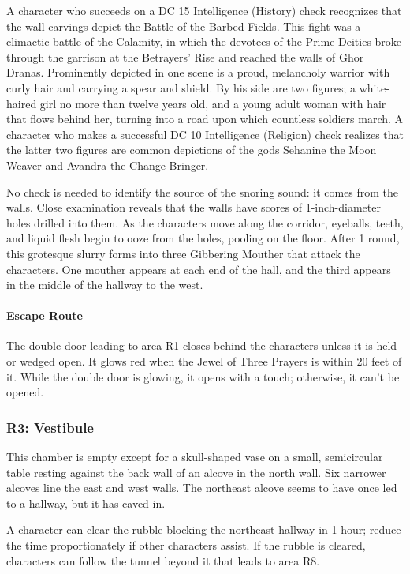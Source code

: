 \documentclass[10pt,a4paper,twoside,twocolumn,openany,nodeprecatedcode]{dndbook}
\begin{document}
A character who succeeds on a DC 15 Intelligence (History) check recognizes that the wall carvings depict the Battle of the Barbed Fields. This fight was a climactic battle of the Calamity, in which the devotees of the Prime Deities broke through the garrison at the Betrayers' Rise and reached the walls of Ghor Dranas. Prominently depicted in one scene is a proud, melancholy warrior with curly hair and carrying a spear and shield. By his side are two figures; a white-haired girl no more than twelve years old, and a young adult woman with hair that flows behind her, turning into a road upon which countless soldiers march. A character who makes a successful DC 10 Intelligence (Religion) check realizes that the latter two figures are common depictions of the gods Sehanine the Moon Weaver and Avandra the Change Bringer.

No check is needed to identify the source of the snoring sound: it comes from the walls. Close examination reveals that the walls have scores of 1-inch-diameter holes drilled into them. As the characters move along the corridor, eyeballs, teeth, and liquid flesh begin to ooze from the holes, pooling on the floor. After 1 round, this grotesque slurry forms into three Gibbering Mouther that attack the characters. One mouther appears at each end of the hall, and the third appears in the middle of the hallway to the west.

\paragraph{Escape Route}
The double door leading to area R1 closes behind the characters unless it is held or wedged open. It glows red when the Jewel of Three Prayers is within 20 feet of it. While the double door is glowing, it opens with a touch; otherwise, it can't be opened.

\subsubsection{R3: Vestibule}
\begin{DndReadAloud}{}
This chamber is empty except for a skull-shaped vase on a small, semicircular table resting against the back wall of an alcove in the north wall. Six narrower alcoves line the east and west walls. The northeast alcove seems to have once led to a hallway, but it has caved in.

\end{DndReadAloud}

A character can clear the rubble blocking the northeast hallway in 1 hour; reduce the time proportionately if other characters assist. If the rubble is cleared, characters can follow the tunnel beyond it that leads to area R8.
\end{document}
